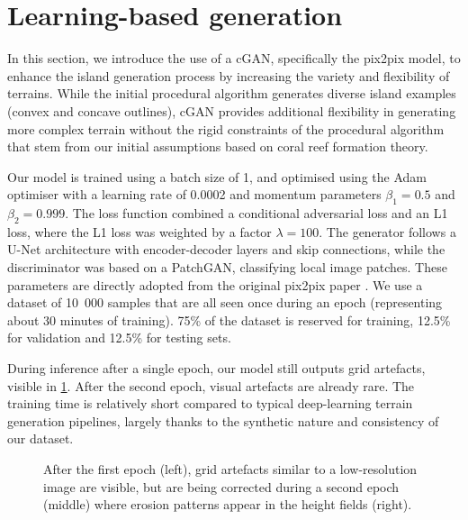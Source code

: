 \section{Learning-based generation}
\label{sec:coral-island-cGAN-training}

In this section, we introduce the use of a cGAN, specifically the pix2pix model, to enhance the island generation process by increasing the variety and flexibility of terrains. While the initial procedural algorithm generates diverse island examples (convex and concave outlines), cGAN provides additional flexibility in generating more complex terrain without the rigid constraints of the procedural algorithm that stem from our initial assumptions based on coral reef formation theory.

Our model is trained using a batch size of 1, and optimised using the Adam optimiser with a learning rate of 0.0002 and momentum parameters $\beta_1 = 0.5$ and $\beta_2 = 0.999$. The loss function combined a conditional adversarial loss and an L1 loss, where the L1 loss was weighted by a factor $\lambda = 100$. The generator follows a U-Net architecture with encoder-decoder layers and skip connections, while the discriminator was based on a PatchGAN, classifying local image patches. These parameters are directly adopted from the original pix2pix paper \cite{Isola2017}. We use a dataset of 10~000 samples that are all seen once during an epoch (representing about 30 minutes of training). 75\% of the dataset is reserved for training, 12.5\% for validation and 12.5\% for testing sets. 

During inference after a single epoch, our model still outputs grid artefacts, visible in \cref{fig:coral-island-first-epoch}. After the second epoch, visual artefacts are already rare. The training time is relatively short compared to typical deep-learning terrain generation pipelines, largely thanks to the synthetic nature and consistency of our dataset. %

\begin{figure}[tb]%
    \caption[Outputs of the cGAN after training on 10~000, 15~000 and 20~000 samples]{After the first epoch (left), grid artefacts similar to a low-resolution image are visible, but are being corrected during a second epoch (middle) where erosion patterns appear in the height fields (right).}
    \label{fig:coral-island-first-epoch}
\end{figure}

